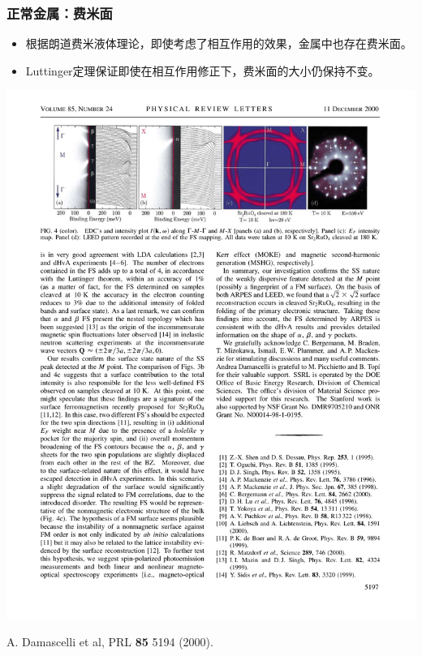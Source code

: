 \documentclass[xcolor=table, 10pt, aspectratio=169]{beamer}
\begin{document}
\begin{frame}
  \frametitle{正常金属：费米面}
\begin{itemize}
  \item 根据朗道费米液体理论，即使考虑了相互作用的效果，金属中也存在费米面。
  \item Luttinger定理保证即使在相互作用修正下，费米面的大小仍保持不变。
\end{itemize}
\begin{center}
	\includegraphics{../resources/SrRuO_FS}

	{\small A. Damascelli et al, PRL \textbf{85} 5194 (2000).}
\end{center}
\end{frame}
\end{document}
